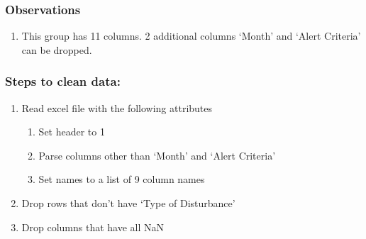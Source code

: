\documentclass[11pt]{article}
\providecommand{\tightlist}{%
      \setlength{\itemsep}{0pt}\setlength{\parskip}{0pt}}
\begin{document}
    \subsubsection{Observations}\label{observations}

\begin{enumerate}
\def\labelenumi{\arabic{enumi}.}
\tightlist
\item
  This group has 11 columns. 2 additional columns `Month' and `Alert
  Criteria' can be dropped.
\end{enumerate}

    \subsubsection{Steps to clean data:}\label{steps-to-clean-data}

\begin{enumerate}
\def\labelenumi{\arabic{enumi}.}
\tightlist
\item
  Read excel file with the following attributes

  \begin{enumerate}
  \def\labelenumii{\arabic{enumii}.}
  \tightlist
  \item
    Set header to 1
  \item
    Parse columns other than `Month' and `Alert Criteria'
  \item
    Set names to a list of 9 column names
  \end{enumerate}
\item
  Drop rows that don't have `Type of Disturbance'
\item
  Drop columns that have all NaN
\end{enumerate}
\end{document}
